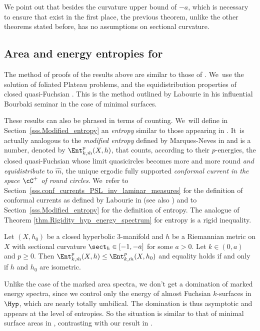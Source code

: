 We point out that besides the curvature upper bound of $-a$, which is necessary to ensure that \ksurfaces exist in the first place, the previous theorem, unlike the other theorems stated before, has no assumptions on sectional curvature.

\subsection{Area and energy entropies for \ksurfaces} The method of proofs of the results above are similar to those of \cite{ALS}. We~use the solution of foliated Plateau problems, and the equidistribution properties of closed quasi-Fuchsian \ksurfaces. This is the method outlined by Labourie in his influential Bourbaki seminar \cite{LabourieBourbaki} in the case of minimal surfaces.

These results can also be phrased in terms of counting. We~will define in Section~\ref{sss.Modified_entropy} an \emph{entropy} similar to those appearing in \cite{ALS,CMN}. It~is actually analogous to the \emph{modified entropy} defined by Marques-Neves in \cite{MN_currents} and is a number, denoted by $\Ent^p_{k,\hat m}(X,h)$, that counts, according to their $p$-energies, the closed quasi-Fuchsian \ksurfaces whose limit quasicircles becomes more and more round \emph{and equidistribute} to $\hat m$, the unique ergodic fully supported \emph{conformal current in the space $\cC^+$ of round circles}. We~refer to Section~\ref{sss.conf_currents_PSL_inv_laminar_measures} for the definition of conformal currents as defined by Labourie in \cite{LabourieBourbaki} (see also \cite{ALS,MN_currents}) and to Section~\ref{sss.Modified_entropy} for the definition of entropy. The analogue of Theorem \ref{thm.Rigidity_hyp_energy_spectrum} for entropy is a rigid inequality.

\begin{theorem}\label{th.rigidity_entropy}
Let $(X,h_0)$ be a closed hyperbolic $3$\nobreakdash-manifold and $h$ be a Riemannian metric on $X$ with sectional curvature $\sect_h\in[-1,-a]$ for some $a>0$. Let $k\in (0,a)$ and $p\geq 0$. Then $\Ent^p_{k,\hat m}(X,h)\leq\Ent^p_{k,\hat m}(X,h_0)$ and equality holds if and only if $h$ and $h_0$ are isometric.
\end{theorem}

\begin{remark}
Unlike the case of the marked area spectra, we don't get a domination of marked energy spectra, since we control only the energy of almost Fuchsian $k$\nobreakdash-surfaces in $\Hyp$, which are nearly totally umbilical. The domination is thus asymptotic and appears at the level of entropies. So the situation is similar to that of minimal surface areas in \cite{CMN}, contrasting with our result in \cite{ALS}.
\end{remark}

